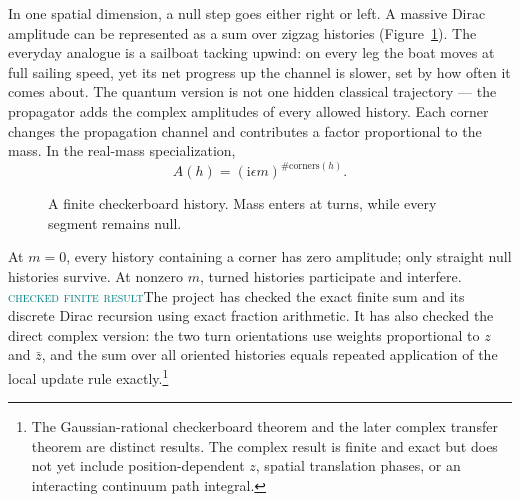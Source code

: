 \documentclass[11pt]{article}
\newcommand{\ii}{\mathrm{i}}
\newcommand{\Mlabel}{\textcolor{teal}{\textsc{checked finite result}}}
\begin{document}
In one spatial dimension, a null step goes either right or left.  A massive
Dirac amplitude can be represented as a sum over zigzag histories
(Figure~\ref{fig:checkerboard}).  The everyday analogue is a sailboat tacking
upwind: on every leg the boat moves at full sailing speed, yet its net
progress up the channel is slower, set by how often it comes about.  The
quantum version is not one hidden classical trajectory --- the propagator adds
the complex amplitudes of every allowed history.  Each corner changes the
propagation channel and contributes a factor proportional to the mass.  In the
real-mass specialization,
\[
  A(h)=(\ii\epsilon m)^{\#\text{corners}(h)}.
\]

\begin{figure}[ht]
\centering
{}
\caption{A finite checkerboard history.  Mass enters at turns, while every
segment remains null.}
\label{fig:checkerboard}
\end{figure}

At $m=0$, every history containing a corner has zero amplitude; only straight
null histories survive.  At nonzero $m$, turned histories participate and
interfere.  \Mlabel\quad The project has checked the exact finite sum and its
discrete Dirac recursion using exact fraction arithmetic.  It has also checked
the direct complex version: the two turn orientations use weights proportional
to $z$ and $\bar z$, and the sum over all oriented histories equals repeated
application of the local update rule exactly.\footnote{The
Gaussian-rational checkerboard theorem and the later complex transfer theorem
are distinct results.  The complex result is finite and exact but does not yet
include position-dependent $z$, spatial translation phases, or an interacting
continuum path integral.}
\end{document}
